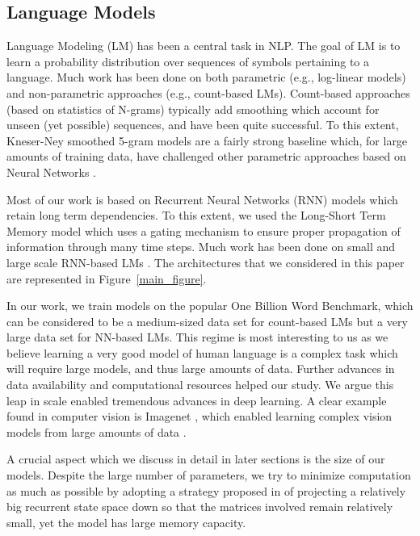 \documentclass{article}
\begin{document}
\subsection{Language Models}
\label{lms}

Language Modeling (LM) has been a central task in NLP. The goal of LM is to learn a probability distribution over sequences of symbols pertaining to a language. Much work has been done on both parametric (e.g., log-linear models) and non-parametric approaches (e.g., count-based LMs). Count-based approaches (based on statistics of N-grams) typically add smoothing which account for unseen (yet possible) sequences, and have been quite successful. To this extent, Kneser-Ney smoothed 5-gram models \cite{kneser1995improved} are a fairly strong baseline which, for large amounts of training data, have challenged other parametric approaches based on Neural Networks \cite{bengio2006neural}.

Most of our work is based on Recurrent Neural Networks (RNN) models which retain long term dependencies. To this extent, we used the Long-Short Term Memory model \cite{hochreiter1997long} which uses a gating mechanism \cite{gers2000learning} to ensure proper propagation of information through many time steps. Much work has been done on small and large scale RNN-based LMs \cite{mikolov2010recurrent,  mikolov2012statistical, chelba2013one,zaremba2014recurrent, williams2015scaling,Blackout,wang2015larger,ji2015document}. The architectures that we considered in this paper are represented in Figure~\ref{main_figure}.

In our work, we train models on the popular One Billion Word Benchmark, which can be considered to be a medium-sized data set for count-based LMs but a very large data set for NN-based LMs. This regime is most interesting to us as we believe learning a very good model of human language is a complex task which will require large models, and thus large amounts of data. Further advances in data availability and computational resources helped our study. We argue this leap in scale enabled tremendous advances in deep learning. A clear example found in computer vision is Imagenet \cite{deng2009imagenet}, which enabled learning complex vision models from large amounts of data \cite{krizhevsky2012imagenet}.

A crucial aspect which we discuss in detail in later sections is the size of our models. Despite the large number of parameters, we try to minimize computation as much as possible by adopting a strategy proposed in \cite{sak2014long} of projecting a relatively big recurrent state space down so that the matrices involved remain relatively small, yet the model has large memory capacity.
\end{document}
